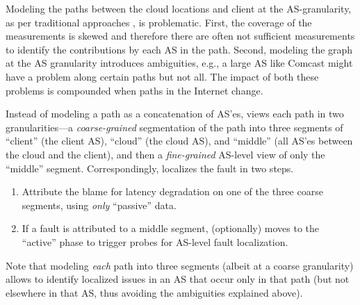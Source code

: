 Modeling the paths between the cloud locations and client at the AS-granularity, as per traditional approaches \cite{castro2004network, zhang2004planetseer}, is problematic. First, the coverage of the measurements is skewed and therefore there are often not sufficient measurements to identify the contributions by each AS in the path. Second, modeling the graph at the AS granularity introduces ambiguities, e.g., a large AS like Comcast might have a problem along certain paths but not all. The impact of both these problems is compounded when paths in the Internet change.

Instead of modeling a path as a concatenation of AS'es, {\name} views each path in two granularities---a {\em coarse-grained} segmentation of the path into three segments of ``client'' (the client AS), ``cloud'' (the cloud AS), and ``middle'' (all AS'es between the cloud and the client), and then a {\em fine-grained} AS-level view  of only the ``middle'' segment. Correspondingly, {\name} localizes the fault in two steps. 
\begin{enumerate}
    \item Attribute the blame for latency degradation on one of the three coarse segments, using {\em only} ``passive'' data.
    \item If a fault is attributed to a middle segment, {\name} (optionally) moves to the ``active'' phase to trigger probes for AS-level fault localization. 
\end{enumerate} 
Note that modeling {\em each} path into three segments (albeit at a coarse granularity) allows {\name} to identify localized issues in an AS that occur only in that path (but not elsewhere in that AS, thus avoiding the ambiguities explained above). 


